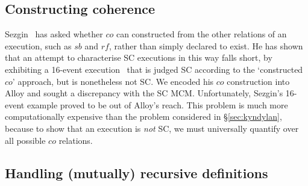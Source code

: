 \subsection{Constructing coherence}
\label{sec:sezgin}

Sezgin~\cite{sezgin04} has asked whether $co$ can constructed from the
other relations of an execution, such as $sb$ and $rf$, rather than
simply declared to exist. He has shown that an attempt to characterise
SC executions in this way falls short, by exhibiting a 16-event
execution~\cite[Fig.~4.3]{sezgin04} that is judged SC according to the
`constructed $co$' approach, but is nonetheless not SC. We encoded his
$co$ construction into Alloy and sought a discrepancy with the SC
MCM. Unfortunately, Sezgin's 16-event example proved to be out of
Alloy's reach. This problem is much more computationally expensive
than the problem considered in \S\ref{sec:kyndylan}, because to show
that an execution is \emph{not} SC, we must universally quantify over
all possible $co$ relations.


\subsection{Handling (mutually) recursive definitions}
\label{sec:fixpoints}

